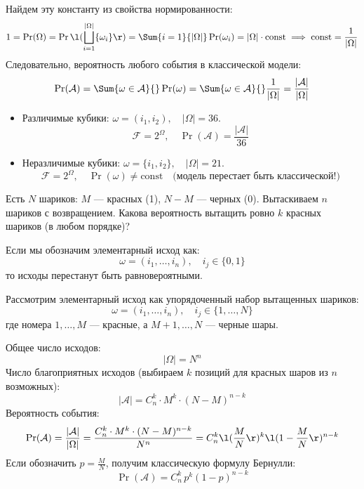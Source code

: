 Найдем эту константу из свойства нормированности:
\[
    1 = \Pr(\Omega) = \Pr\l(\bigsqcup^{|\Omega|}_{i = 1} \{\omega_i\}\r) = \Sum{i = 1}{|\Omega|} \Pr(\omega_i) = |\Omega| \cdot \text{const} \implies \text{const} = \frac{1}{|\Omega|}
\]
Следовательно, вероятность любого события в классической модели:
\[
    \Pr(\mathcal{A}) = \Sum{\omega \in \mathcal{A}}{} \Pr(\omega) = \Sum{\omega \in \mathcal{A}}{} \frac{1}{|\Omega|} = \frac{|\mathcal{A}|}{|\Omega|}
\]

\begin{example}
    \begin{itemize}
        \item Различимые кубики: $\omega = (i_1, i_2), \quad |\Omega| = 36$.
        \[
            \mathcal{F} = 2^{\Omega}, \quad \Pr(\mathcal{A}) = \frac{|\mathcal{A}|}{36}
        \]
        \item Неразличимые кубики: $\omega = \{i_1, i_2\}, \quad |\Omega| = 21$.
        \[
            \mathcal{F} = 2^{\Omega}, \quad \Pr(\omega) \neq \text{const} \quad \text{(модель перестает быть классической!)}
        \]
    \end{itemize}
\end{example}

\begin{task}
    Есть $N$ шариков: $M$ --- красных (1), $N - M$ --- черных (0). 
    Вытаскиваем $n$ шариков с возвращением. Какова вероятность вытащить ровно $k$ красных шариков (в любом порядке)?
\end{task}

\begin{solution}
    Если мы обозначим элементарный исход как: 
    \[
        \omega = (i_1, \dots, i_n), \quad i_j \in \{0, 1\}
    \]
    то исходы перестанут быть равновероятными. 

    Рассмотрим элементарный исход как упорядоченный набор вытащенных шариков:
    \[
        \omega = (i_1, \dots, i_n), \quad i_j \in \{1, \dots, N\}
    \]
    где номера $1, \dots, M$ --- красные, а $M+1, \dots, N$ --- черные шары.
    
    Общее число исходов:
    \[
        |\Omega| = N^n
    \]
    Число благоприятных исходов (выбираем $k$ позиций для красных шаров из $n$ возможных):
    \[
        |\mathcal{A}| = C_n^k \cdot M^k \cdot (N - M)^{n - k}
    \]
    Вероятность события:
    \[
        \Pr(\mathcal{A}) = \frac{|\mathcal{A}|}{|\Omega|} = \frac{C_n^k \cdot M^k \cdot (N - M)^{n-k}}{N^n} = C_n^k \l( \frac{M}{N} \r)^k \l(1 - \frac{M}{N} \r)^{n-k}  
    \]
    Если обозначить $p = \frac{M}{N}$, получим классическую формулу Бернулли:
    \[
        \Pr(\mathcal{A}) = C_n^k \, p^k (1 - p)^{n-k} 
    \]
\end{solution}

